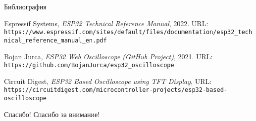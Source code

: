 \documentclass{beamer}
\begin{document}
\begin{frame}[allowframebreaks]{Библиография}
\begin{thebibliography}{9}

Espressif Systems,  
\textit{ESP32 Technical Reference Manual},  
2022. URL: \texttt{https://www.espressif.com/sites/default/files/documentation/esp32_technical_reference_manual_en.pdf}

Bojan Jurca,  
\textit{ESP32 Web Oscilloscope (GitHub Project)},  
2021. URL: \texttt{https://github.com/BojanJurca/esp32_oscilloscope}

Circuit Digest,  
\textit{ESP32 Based Oscilloscope using TFT Display},  
URL: \texttt{https://circuitdigest.com/microcontroller-projects/esp32-based-oscilloscope}

\end{thebibliography}
\end{frame}

\begin{frame}{Спасибо!}
Спасибо за внимание!
\end{frame}
\end{document}
